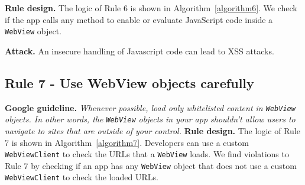 \textbf{Rule design.} The logic of Rule 6 is shown in Algorithm~\ref{algorithm6}. We check if the app calls any method to enable or evaluate JavaScript code inside a \texttt{WebView} object. 

\setcounter{algocf}{5}
\begin{algorithm}[]
\SetAlgoLined
{}
\caption{}
\label{algorithm6}
\end{algorithm}

\textbf{Attack.} An insecure handling of Javascript code can lead to \gls{XSS} attacks. 


\subsection{Rule 7 - Use WebView objects carefully} 
\textbf{Google guideline.} \emph{Whenever possible, load only whitelisted content in \texttt{WebView} objects. In other words, the \texttt{WebView} objects in your app shouldn't allow users to navigate to sites that are outside of your control.}
\textbf{Rule design.} The logic of Rule 7 is shown in Algorithm~\ref{algorithm7}. Developers can use a custom \texttt{WebViewClient} to check the URLs that a \texttt{WebView} loads. We find violations to Rule 7 by checking if an app has any \texttt{WebView} object that does not use a custom \texttt{WebViewClient} to check the loaded URLs. 

\setcounter{algocf}{6}
\begin{algorithm}[]
\SetAlgoLined
{}
\caption{}
\label{algorithm7}
\end{algorithm}

